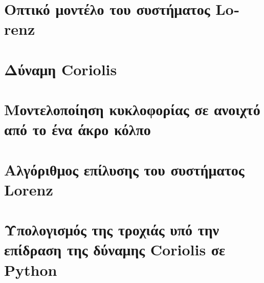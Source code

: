 \documentclass[12pt, a4paper, oneside]{extarticle}
\numberwithin{equation}{subsection}
\def\lat#1{\textlatin{#1}}
\begin{document}
	\tableofcontents
		\thispagestyle{pagenum}
	\clearpage

		\listoffigures
		\thispagestyle{pagenum}
	\cleardoublepage

		\listoftables
		\thispagestyle{pagenum}
	\cleardoublepage

		\lstlistoflistings
		\thispagestyle{pagenum}
	\cleardoublepage

	\section{Οπτικό μοντέλο του συστήματος \lat{Lorenz}}
		
	\cleardoublepage
	\section{Δύναμη \lat{Coriolis}}
		
	\cleardoublepage
	\section{Μοντελοποίηση κυκλοφορίας σε ανοιχτό από το ένα άκρο κόλπο}
		
	\cleardoublepage
	\nocite{*}
	\lat{}

	\cleardoublepage



	\appendix
		\section{Αλγόριθμος επίλυσης του συστήματος \textlatin{Lorenz}}
		\pagestyle{appendix}
		\label{sec:lorenzPython}
		\lstset{style=withnums}
		
		\cleardoublepage
		\section{Υπολογισμός της τροχιάς υπό την επίδραση της δύναμης Coriolis σε \textlatin{Python}}
		\pagestyle{appendix}
		\label{sec:corPython}
		\lstset{style=withnums}
		
		\cleardoublepage
\end{document}
